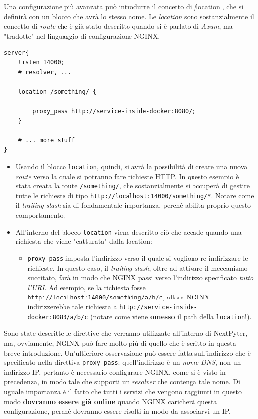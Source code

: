 Una configurazione più avanzata può introdurre il concetto di \textit|location|, che si definirà con un blocco che avrà lo stesso nome. Le \textit{location} sono sostanzialmente il concetto di \textit{route} che è già stato descritto quando si è parlato di \textit{Axum}, ma "tradotte" nel linguaggio di configurazione NGINX.
\begin{verbatim}
server{
    listen 14000;
    # resolver, ...

    location /something/ {

        proxy_pass http://service-inside-docker:8080/;
    }

    # ... more stuff
}
\end{verbatim}
\begin{itemize}
    \item Usando il blocco \verb|location|, quindi, si avrà la possibilità di creare una nuova \textit{route} verso la quale si potranno fare richieste HTTP. In questo esempio è stata creata la route \verb|/something/|, che sostanzialmente si occuperà di gestire tutte le richieste di tipo \verb|http://localhost:14000/something/*|. Notare come il \textit{trailing slash} sia di fondamentale importanza, perché abilita proprio questo comportamento;
    \item All'interno del blocco \verb|location| viene descritto ciò che accade quando una richiesta che viene "catturata" dalla location:
        \begin{itemize}
            \item \verb|proxy_pass| imposta l'indirizzo verso il quale si vogliono re-indirizzare le richieste. In questo caso, il \textit{trailing slash}, oltre ad attivare il meccanismo succitato, farà in modo che NGINX passi verso l'indirizzo specificato \textit{tutto l'URI}. Ad esempio, se la richiesta fosse \newline\verb|http://localhost:14000/something/a/b/c|, allora NGINX indirizzerebbe tale richiesta a \verb|http://service-inside-docker:8080/a/b/c| (notare come viene \textbf{omesso} il path della \verb|location|!). 
        \end{itemize}
\end{itemize}
Sono state descritte le direttive che verranno utilizzate all'interno di NextPyter, ma, ovviamente, NGINX può fare molto più di quello che è scritto in questa breve introduzione.
\newline
Un'ultieriore osservazione può essere fatta sull'indirizzo che è specificato nella direttiva \verb|proxy_pass|: quell'indirizzo è un \textit{nome DNS}, non un indirizzo IP, pertanto è necessario configurare NGINX, come si è visto in precedenza, in modo tale che supporti un \textit{resolver} che contenga tale nome. Di uguale importanza è il fatto che tutti i servizi che vengono raggiunti in questo modo \textbf{dovranno essere già online} quando NGINX caricherà questa configurazione, perché dovranno essere risolti in modo da associarvi un IP.
